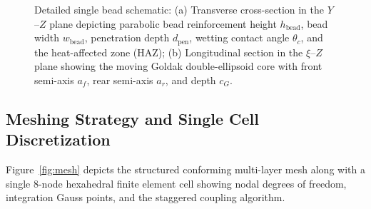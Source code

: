 \documentclass[10pt,a4paper]{article}
\begin{document}
\begin{figure}[h!]
\caption{Detailed single bead schematic: (a) Transverse cross-section in the $Y$--$Z$ plane depicting parabolic bead reinforcement height $h_{\mathrm{bead}}$, bead width $w_{\mathrm{bead}}$, penetration depth $d_{\mathrm{pen}}$, wetting contact angle $\theta_c$, and the heat-affected zone (HAZ); (b) Longitudinal section in the $\xi$--$Z$ plane showing the moving Goldak double-ellipsoid core with front semi-axis $a_f$, rear semi-axis $a_r$, and depth $c_G$.}
\label{fig:bead}
\end{figure}

\subsection{Meshing Strategy and Single Cell Discretization}
Figure~\ref{fig:mesh} depicts the structured conforming multi-layer mesh along with a single 8-node hexahedral finite element cell showing nodal degrees of freedom, integration Gauss points, and the staggered coupling algorithm.
\end{document}
